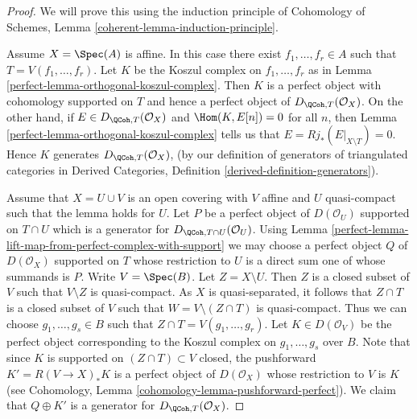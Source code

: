 \begin{proof}

We will prove this using the induction principle of
Cohomology of Schemes, Lemma \ref{coherent-lemma-induction-principle}.

\medskip\noindent
Assume $X = \Spec(A)$ is affine. In this case there exist
$f_1, \ldots, f_r \in A$ such that $T = V(f_1, \ldots, f_r)$.
Let $K$ be the Koszul complex on $f_1, \ldots, f_r$ as in
Lemma \ref{perfect-lemma-orthogonal-koszul-complex}.
Then $K$ is a perfect object with cohomology supported on
$T$ and hence a perfect object of $D_{\QCoh, T}(\mathcal{O}_X)$.
On the other hand, if $E \in D_{\QCoh, T}(\mathcal{O}_X)$ and
$\Hom(K, E[n]) = 0$ for all $n$, then
Lemma \ref{perfect-lemma-orthogonal-koszul-complex}
tells us that $E = Rj_*(E|_{X \setminus T}) = 0$.
Hence $K$ generates $D_{\QCoh, T}(\mathcal{O}_X)$,
(by our definition of generators of triangulated categories in
Derived Categories, Definition \ref{derived-definition-generators}).

\medskip\noindent
Assume that $X = U \cup V$ is an open covering with $V$ affine and
$U$ quasi-compact such that the lemma holds for $U$.
Let $P$ be a perfect object of $D(\mathcal{O}_U)$ supported on $T \cap U$
which is a generator for $D_{\QCoh, T \cap U}(\mathcal{O}_U)$. Using
Lemma \ref{perfect-lemma-lift-map-from-perfect-complex-with-support}
we may choose a perfect object $Q$ of $D(\mathcal{O}_X)$ supported on $T$
whose restriction to $U$ is a direct sum one of whose summands is $P$.
Write $V = \Spec(B)$. Let $Z = X \setminus U$. Then $Z$ is a closed subset
of $V$ such that $V \setminus Z$ is quasi-compact. As $X$ is quasi-separated,
it follows that $Z \cap T$ is a closed subset of $V$ such that
$W = V \setminus (Z \cap T)$ is quasi-compact. Thus we can choose
$g_1, \ldots, g_s \in B$ such that $Z \cap T = V(g_1, \ldots, g_r)$.
Let $K \in D(\mathcal{O}_V)$ be the perfect object corresponding to the
Koszul complex on $g_1, \ldots, g_s$ over $B$. Note that since $K$ is
supported on $(Z \cap T) \subset V$ closed, the pushforward
$K' = R(V \to X)_*K$ is a perfect object of $D(\mathcal{O}_X)$ whose
restriction to $V$ is $K$ (see
Cohomology, Lemma \ref{cohomology-lemma-pushforward-perfect}).
We claim that $Q \oplus K'$ is a generator for
$D_{\QCoh, T}(\mathcal{O}_X)$.


\end{proof}
